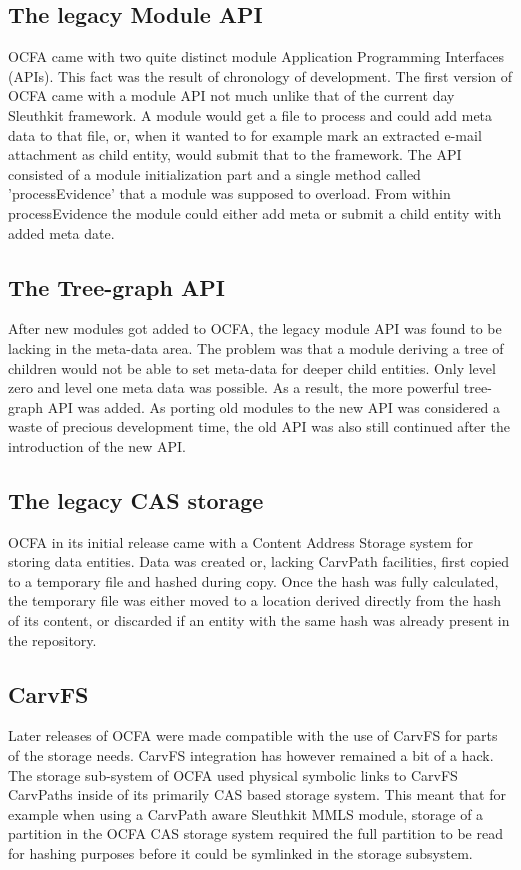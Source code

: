 \subsection{The legacy Module API}
OCFA came with two quite distinct module Application Programming Interfaces (APIs). This fact was the result of chronology of development. The first version of OCFA came with a module API not much unlike that of the current day Sleuthkit framework. A module would get a file to process and could add meta data to that file, or, when it wanted to for example mark an extracted e-mail attachment as child entity, would submit that to the framework. The API consisted of a module initialization part and a single method called 'processEvidence' that a module was supposed to overload. From within processEvidence the module could either add meta or submit a child entity with added meta date.
\subsection{The Tree-graph API}
After new modules got added to OCFA, the legacy module API was found to be lacking in the meta-data area. The problem was that a module deriving a tree of children would not be able to set meta-data for deeper child entities. Only level zero and level one meta data was possible. As a result, the more powerful tree-graph API was added. As porting old modules to the new API was considered a waste of precious development time, the old API was also still continued after the introduction of the new API.
\subsection{The legacy CAS storage}
OCFA in its initial release came with a Content Address Storage system for storing data entities. Data was created or, lacking CarvPath facilities, first copied to a temporary file and hashed during copy. Once the hash was fully calculated, the temporary file was either moved to a location derived directly from the hash of its content, or discarded if an entity with the same hash was already present in the repository. 
\subsection{CarvFS}
Later releases of OCFA were made compatible with the use of CarvFS for parts of the storage needs. CarvFS integration has however remained a bit of a hack. The storage sub-system of OCFA used physical symbolic links to CarvFS CarvPaths inside of its primarily CAS based storage system. This meant that for example when using a CarvPath aware Sleuthkit MMLS module, storage of a partition in the OCFA CAS storage system required the full partition to be read for hashing purposes before it could be symlinked in the storage subsystem.
